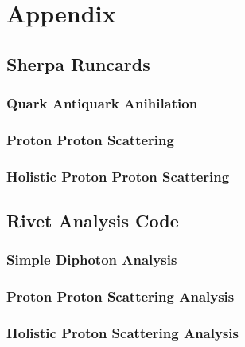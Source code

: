 \chapter{Appendix}%
\label{chap:appendix}

\section{Sherpa Runcards}%
\label{sec:runcards}

\subsection{Quark Antiquark Anihilation}%
\label{sec:qqggruncard}

\subsection{Proton Proton Scattering}%
\label{sec:ppruncard}

\subsection{Holistic Proton Proton Scattering}%
\label{sec:ppruncardfull}

\section{Rivet Analysis Code}%
\label{sec:rivetcode}

\subsection{Simple Diphoton Analysis}%
\label{sec:simpdiphotriv}

\subsection{Proton Proton Scattering Analysis}%
\label{sec:ppanalysis}

\subsection{Holistic Proton Scattering Analysis}%
\label{sec:ppanalysisfull}

